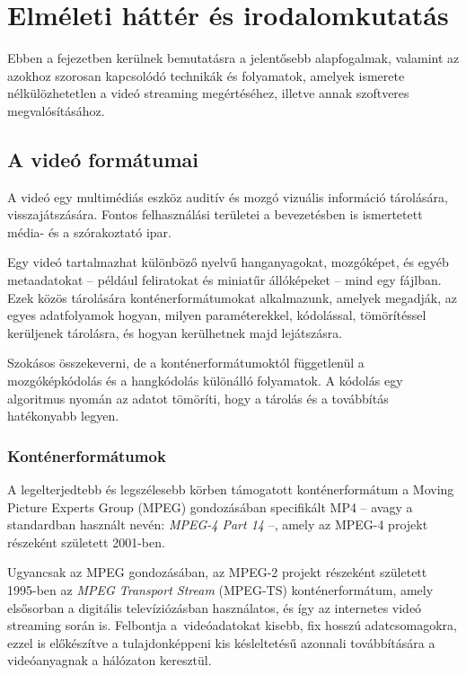 \chapter{Elméleti háttér és irodalomkutatás}

Ebben a fejezetben kerülnek bemutatásra a jelentősebb alapfogalmak, valamint az azokhoz szorosan kapcsolódó technikák és folyamatok, amelyek ismerete nélkülözhetetlen a videó streaming megértéséhez, illetve annak szoftveres megvalósításához.

\section{A videó formátumai}

A videó egy multimédiás eszköz auditív és mozgó vizuális információ tárolására, visszajátszására. Fontos felhasználási területei a bevezetésben is ismertetett média- és a szórakoztató ipar.

Egy videó tartalmazhat különböző nyelvű hanganyagokat, mozgóképet, és egyéb metaadatokat -- például feliratokat és miniatűr állóképeket -- mind egy fájlban. Ezek közös tárolására konténerformátumokat alkalmazunk, amelyek megadják, az egyes adatfolyamok hogyan, milyen paraméterekkel, kódolással, tömörítéssel kerüljenek tárolásra, és hogyan kerülhetnek majd lejátszásra.

Szokásos összekeverni, de a konténerformátumoktól függetlenül a mozgóképkódolás és a hangkódolás különálló folyamatok. A kódolás egy algoritmus nyomán az adatot tömöríti, hogy a tárolás és a továbbítás hatékonyabb legyen.

\subsection{Konténerformátumok}

A legelterjedtebb és legszélesebb körben támogatott konténerformátum a Moving Picture Experts Group (MPEG) gondozásában specifikált MP4 -- avagy a standardban használt nevén: \emph{MPEG-4 Part 14} --, amely az MPEG-4 projekt részeként született 2001-ben.

Ugyancsak az MPEG gondozásában, az MPEG-2 projekt részeként született 1995-ben az \emph{MPEG Transport Stream} (MPEG-TS) konténerformátum, amely elsősorban a digitális televíziózásban használatos, és így az internetes videó streaming során is. Felbontja a~videóadatokat kisebb, fix hosszú adatcsomagokra, ezzel is előkészítve a tulajdonképpeni kis késleltetésű azonnali továbbítására a videóanyagnak a hálózaton keresztül.

